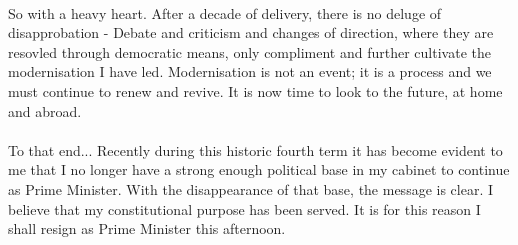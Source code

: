 \documentclass[14pt]{article}
\begin{document}
\begin{onehalfspace}
\paragraph{}So with a heavy heart. After a decade of delivery, there is no deluge of disapprobation - Debate and criticism and changes of direction, where they are resovled through democratic means, only compliment and further cultivate the modernisation I have led. Modernisation is not an event; it is a process and we must continue to renew and revive. It is now time to look to the future, at home and abroad.

\paragraph{}To that end... Recently during this historic fourth term it has become evident to me that I no longer have a strong enough political base in my cabinet to continue as Prime Minister. With the disappearance of that base, the message is clear. I believe that my constitutional purpose has been served. It is for this reason I shall resign as Prime Minister this afternoon.

\end{onehalfspace}
\end{document}
